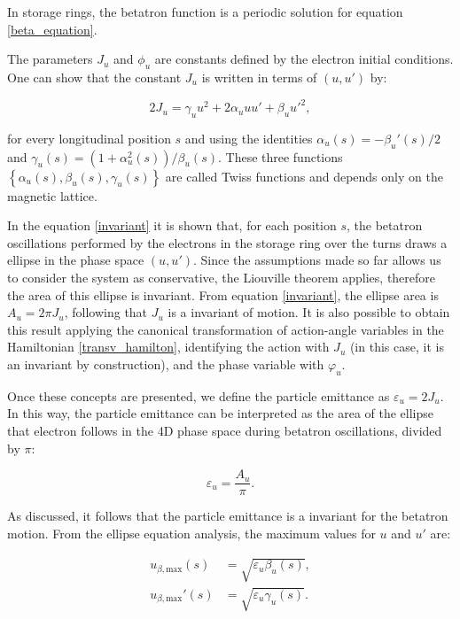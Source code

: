 In storage rings, the betatron function is a periodic solution for equation \eqref{beta_equation}.

The parameters $J_u$ and $\phi_u$ are constants defined by the electron initial conditions. One can show that the constant $J_u$ is written in terms of $(u, u')$ by:

\begin{equation}
    2J_u = \gamma_u u^2 + 2 \alpha_u u u' + \beta_u {u'}^2,
    \label{invariant}
\end{equation}

for every longitudinal position $s$ and using the identities $\alpha_u(s) = -\beta_u'(s)/2$ and $\gamma_u(s) = (1 + \alpha_u^2(s))/\beta_u(s)$. These three functions $\left\{\alpha_u(s), \beta_u(s), \gamma_u(s)\right\}$ are called Twiss functions and depends only on the magnetic lattice.

In the equation \eqref{invariant} it is shown that, for each position $s$, the betatron oscillations performed by the electrons  in the storage ring over the turns draws a ellipse in the phase space $(u, u')$. Since the assumptions made so far allows us to consider the system as conservative, the Liouville theorem applies, therefore the area of this ellipse is invariant. From equation \eqref{invariant}, the ellipse area is $A_u = 2 \pi J_u$, following that $J_u$ is a invariant of motion. It is also possible to obtain this result applying the canonical transformation of action-angle variables in the Hamiltonian \eqref{transv_hamilton}, identifying the action with $J_u$ (in this case, it is an invariant by construction), and the phase variable with $\varphi_u$.

Once these concepts are presented, we define the particle emittance as $\varepsilon_u = 2J_u$. In this way, the particle emittance can be interpreted as the area of the ellipse that electron follows in the 4D phase space during betatron oscillations, divided by $\pi$:

\begin{equation}
    \varepsilon_u = \frac{A_u}{\pi}.
\end{equation}

As discussed, it follows that the particle emittance is a invariant for the betatron motion. From the ellipse equation analysis, the maximum values for $u$ and $u'$ are:

\begin{align}
    u_{\beta, \mathrm{max}}(s) &= \sqrt{\varepsilon_u \beta_u(s)}, \\
    {u}_{\beta, \mathrm{max}}'(s) &= \sqrt{\varepsilon_u \gamma_u(s)}.
\end{align}

